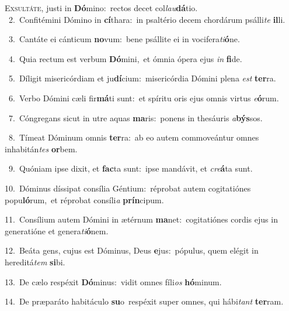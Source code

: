 \lettrine{\initial\textcolor{\initialcolor}{E}}{xsultáte,} justi in \textbf{Dó}\-mino:~\star rectos decet col\-\textit{lau}\-\textbf{dá}tio.\\
{\numbfont\textcolor{\numbcolor}{~2.}}~Confitémini Dómino in \textbf{cí}\-thara:~\star in psaltério decem chordárum psálli\textit{te} \textbf{il}\-li.\par
{\numbfont\textcolor{\numbcolor}{~3.}}~Cantáte ei cánticum \textbf{no}\-vum:~\star bene psállite ei in vocifera\-\textit{ti}\-\textbf{ó}ne.\par
{\numbfont\textcolor{\numbcolor}{~4.}}~Quia rectum est verbum \textbf{Dó}\-mini,~\star et ómnia ópera ejus \textit{in} \textbf{fi}\-de.\par
{\numbfont\textcolor{\numbcolor}{~5.}}~Díligit misericórdiam et ju\-\textbf{dí}\-cium:~\star misericórdia Dómini plena \textit{est} \textbf{ter}\-ra.\par
{\numbfont\textcolor{\numbcolor}{~6.}}~Verbo Dómini cæli fir\-\textbf{má}\-ti sunt:~\star et spíritu oris ejus omnis virtus \textit{e}\-\textbf{ó}rum.\par
{\numbfont\textcolor{\numbcolor}{~7.}}~Cóngregans sicut in utre aquas \textbf{ma}\-ris:~\star ponens in thesáuris \textit{a}\-\textbf{býs}sos.\par
{\numbfont\textcolor{\numbcolor}{~8.}}~Tímeat Dóminum omnis \textbf{ter}\-ra:~\star ab eo autem commoveántur omnes inhabitán\textit{tes} \textbf{or}\-bem.\par
{\numbfont\textcolor{\numbcolor}{~9.}}~Quóniam ipse dixit, et \textbf{fac}\-ta sunt:~\star ipse mandávit, et \textit{cre}\-\textbf{á}ta sunt.\par
{\numbfont\textcolor{\numbcolor}{10.}}~Dóminus díssipat consília Géntium:~\dagger réprobat autem cogitatiónes popu\-\textbf{ló}\-rum,~\star et réprobat consíli\textit{a} \textbf{prín}\-cipum.\par
{\numbfont\textcolor{\numbcolor}{11.}}~Consílium autem Dómini in ætérnum \textbf{ma}\-net:~\star cogitatiónes cordis ejus in generatióne et genera\-\textit{ti}\-\textbf{ó}nem.\par
{\numbfont\textcolor{\numbcolor}{12.}}~Beáta gens, cujus est Dóminus, Deus \textbf{e}\-jus:~\star pópulus, quem elégit in hereditá\textit{tem} \textbf{si}\-bi.\par
{\numbfont\textcolor{\numbcolor}{13.}}~De cælo respéxit \textbf{Dó}\-minus:~\star vidit omnes fíli\textit{os} \textbf{hó}\-minum.\par
{\numbfont\textcolor{\numbcolor}{14.}}~De præparáto habitáculo \textbf{su}\-o~\star respéxit super omnes, qui hábi\textit{tant} \textbf{ter}\-ram.\par
